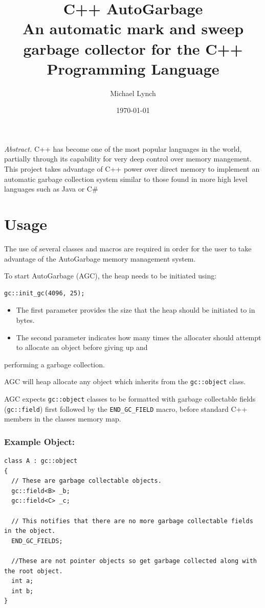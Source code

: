 \documentclass[11pt]{article}
\author{Michael Lynch}
\date{\today}
\title{C++ AutoGarbage\\\medskip
\large An automatic mark and sweep garbage collector for the C++ Programming Language}
\begin{document}
\maketitle

\newpage
\tableofcontents
\newpage

\emph{Abstract.} C++ has become one of the most popular languages in the world, partially through its capability for very deep control
over memory mangement.
This project takes advantage of C++ power over direct memory to implement an automatic garbage collection system
similar to those found in more high level languages such as Java or C\#
\section{Usage}
\label{sec:orgad3520d}
The use of several classes and macros are required in order for the user to take advantage of the AutoGarbage memory management system.

To start AutoGarbage (AGC), the heap needs to be initiated using:
\begin{verbatim}
gc::init_gc(4096, 25);
\end{verbatim}

\begin{itemize}
\item The first parameter provides the size that the heap should be initiated to in bytes.
\item The second parameter indicates how many times the allocater should attempt to allocate an object before giving up and
\end{itemize}
performing a garbage collection.

AGC will heap allocate any object which inherits from the \texttt{gc::object} class.

AGC expects \texttt{gc::object} classes to be formatted with garbage collectable fields (\texttt{gc::field}) first followed by the \texttt{END\_GC\_FIELD} macro,
before standard C++ members in the classes memory map.
\subsubsection{Example Object:}
\label{sec:org3f6c09e}
\begin{verbatim}
class A : gc::object
{
  // These are garbage collectable objects.
  gc::field<B> _b;
  gc::field<C> _c;

  // This notifies that there are no more garbage collectable fields in the object.
  END_GC_FIELDS;

  //These are not pointer objects so get garbage collected along with the root object.
  int a;
  int b;
}
\end{verbatim}
\end{document}
